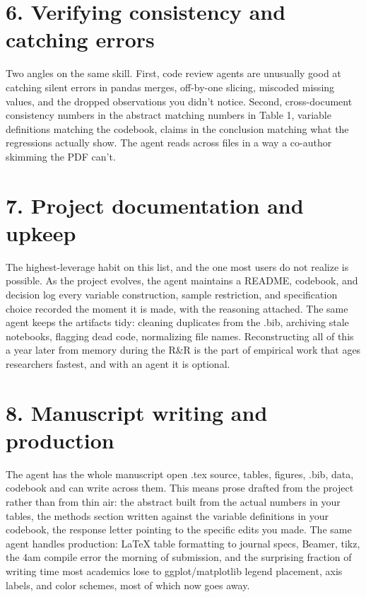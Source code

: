 \documentclass[11pt]{article}
\begin{document}
\section*{6. Verifying consistency and catching errors}

Two angles on the same skill. First, code review \textemdash{} agents are unusually good at catching silent errors in pandas merges, off-by-one slicing, miscoded missing values, and the dropped observations you didn't notice. Second, cross-document consistency \textemdash{} numbers in the abstract matching numbers in Table 1, variable definitions matching the codebook, claims in the conclusion matching what the regressions actually show. The agent reads across files in a way a co-author skimming the PDF can't.

\section*{7. Project documentation and upkeep}

The highest-leverage habit on this list, and the one most users do not realize is possible. As the project evolves, the agent maintains a README, codebook, and decision log \textemdash{} every variable construction, sample restriction, and specification choice recorded the moment it is made, with the reasoning attached. The same agent keeps the artifacts tidy: cleaning duplicates from the .bib, archiving stale notebooks, flagging dead code, normalizing file names. Reconstructing all of this a year later from memory during the R\&R is the part of empirical work that ages researchers fastest, and with an agent it is optional.

\section*{8. Manuscript writing and production}

The agent has the whole manuscript open \textemdash{} .tex source, tables, figures, .bib, data, codebook \textemdash{} and can write across them. This means prose drafted from the project rather than from thin air: the abstract built from the actual numbers in your tables, the methods section written against the variable definitions in your codebook, the response letter pointing to the specific edits you made. The same agent handles production: LaTeX table formatting to journal specs, Beamer, tikz, the 4am compile error the morning of submission, and the surprising fraction of writing time most academics lose to ggplot/matplotlib legend placement, axis labels, and color schemes, most of which now goes away.
\end{document}

